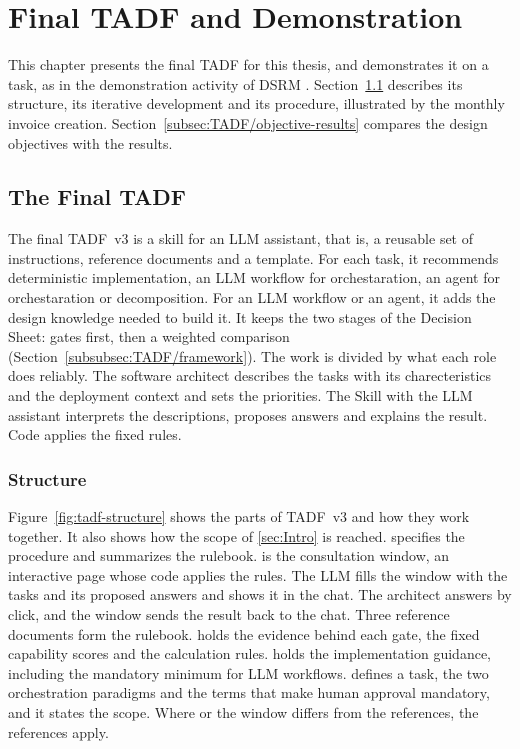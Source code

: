 \section{Final TADF and Demonstration}
\label{sec:TADF/final}

This chapter presents the final  TADF for this thesis, and demonstrates it on a task, as in the demonstration activity of DSRM \parencite{peffersDesignScienceResearch2007}. Section~\ref{subsec:TADF/artifact} describes its structure, its iterative development and its procedure, illustrated by the monthly invoice creation. Section~\ref{subsec:TADF/objective-results} compares the design objectives with the results.

\subsection{The Final TADF}
\label{subsec:TADF/artifact}

The final TADF~v3 is a skill for an LLM assistant, that is, a reusable set of instructions, reference documents and a template. For each task, it recommends deterministic implementation, an LLM workflow for orchestaration, an agent for orchestaration or decomposition. For an LLM workflow or an agent, it adds the design knowledge needed to build it. It keeps the two stages of the Decision Sheet: gates first, then a weighted comparison (Section~\ref{subsubsec:TADF/framework}). The work is divided by what each role does reliably. The software architect describes the tasks with its charecteristics and the deployment context and sets the priorities. The Skill with the LLM assistant interprets the descriptions, proposes answers and explains the result. Code applies the fixed rules. 

\subsubsection{Structure}
\label{subsubsec:TADF/artifact-form}
\label{subsubsec:TADF/artifact-documents}

Figure~\ref{fig:tadf-structure} shows the parts of TADF~v3 and how they work together. It also shows how the scope of \ref{sec:Intro} is reached.  specifies the procedure and summarizes the rulebook.  is the consultation window, an interactive page whose code applies the rules. The LLM fills the window with the tasks and its proposed answers and shows it in the chat. The architect answers by click, and the window sends the result back to the chat. Three reference documents form the rulebook.  holds the evidence behind each gate, the fixed capability scores and the calculation rules.  holds the implementation guidance, including the mandatory minimum for LLM workflows.  defines a task, the two orchestration paradigms and the terms that make human approval mandatory, and it states the scope. Where  or the window differs from the references, the references apply.


